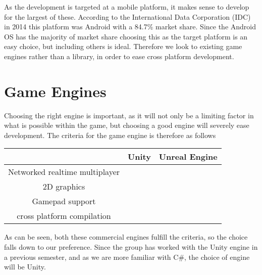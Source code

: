 As the development is targeted at a mobile platform, it makes sense to develop for the largest of these. 
According to the International Data Corporation (IDC) in 2014 this platform was Android with a 84.7\% market share\cite{marketshare}.
Since the Android OS has the majority of market share choosing this as the target platform is an easy choice, but including others is ideal.
Therefore we look to existing game engines rather than a library, in order to ease cross platform development.

\section{Game Engines}
Choosing the right engine is important, as it will not only be a limiting factor in what is possible within the game, but choosing a good engine will severely ease development.
The criteria for the game engine is therefore as follows 

\begin{center}
	\begin{tabular}{| c | c | c |}
		\hline
			 & Unity & Unreal Engine \\ \hline
		Networked realtime multiplayer & \checkmark & \checkmark \\ \hline
		2D graphics & \checkmark & \checkmark \\ \hline
		Gamepad support & \checkmark & \checkmark \\ \hline
		cross platform compilation & \checkmark & \checkmark \\ \hline
	\end{tabular}
\end{center}

As can be seen, both these commercial engines fulfill the criteria, so the choice falls down to our preference.
Since the group has worked with the Unity engine in a previous semester, and as we are more familiar with C\#, the choice of engine will be Unity.
